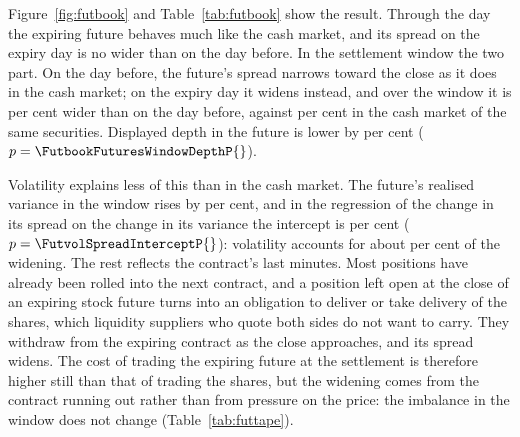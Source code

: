 Figure~\ref{fig:futbook} and Table~\ref{tab:futbook} show the result. Through the day the
expiring future behaves much like the cash market, and its spread on the expiry day is no
wider than on the day before. In the settlement window the two part. On the day before, the future's spread narrows
toward the close as it does in the cash market; on the expiry day it widens instead, and over the
window it is \FutbookFuturesWindowSpread{} per cent wider than on the day before, against
\FutbookCashWindowSpread{} per cent in the cash market of the same securities.
Displayed depth in the future is lower by \FutbookFuturesWindowDepth{} per cent
($p = \FutbookFuturesWindowDepthP{}$).

Volatility explains less of this than in the cash market. The future's realised variance in the
window rises by \FutbookFuturesWindowRv{} per cent, and in the regression of the change in its
spread on the change in its variance the intercept is \FutvolSpreadIntercept{} per cent
($p = \FutvolSpreadInterceptP{}$): volatility accounts for about \FutvolSpreadExplained{} per cent
of the widening. The rest reflects the contract's last minutes. Most positions have already been
rolled into the next contract, and a position left open at the close of an expiring stock future
turns into an obligation to deliver or take delivery of the shares, which liquidity suppliers who
quote both sides do not want to carry. They withdraw from the expiring contract as the close
approaches, and its spread widens. The cost of trading the expiring future at the settlement is
therefore higher still than that of trading the shares, but the widening comes from the contract
running out rather than from pressure on the price: the imbalance in the window does not change
(Table~\ref{tab:futtape}).
